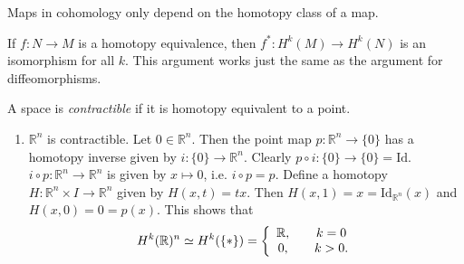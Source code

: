 \begin{enumerate}
{    \begin{theorem}
      Maps in cohomology only depend on the homotopy class of a map.
    \end{theorem}

    \begin{corol}
      If $f: N \to M$ is a homotopy equivalence, then
      $f^\ast : H^k(M) \to H^k(N)$ is an isomorphism for all $k$. This
      argument works just the same as the argument for diffeomorphisms.
    \end{corol}
  }
\end{enumerate}

\begin{defn}
  A space is \emph{contractible} if it is homotopy equivalent to a point.
\end{defn}

\begin{xmpl}
  \begin{enumerate}
    \item{
      $\mathbb{R}^n$ is contractible. Let $0 \in \mathbb{R}^n$. Then
      the point map $p : \mathbb{R}^n \to \{ 0 \}$ has a homotopy
      inverse given by $i: \{0\} \to \mathbb{R}^n$. Clearly
      $p \circ i : \{0\} \to \{0\} = \mathrm{Id}$.
      $i \circ p : \mathbb{R}^n \to \mathbb{R}^n$ is given by
      $x \mapsto 0$, i.e. $i \circ p = p$. Define a homotopy
      $H: \mathbb{R}^n \times I \to \mathbb{R}^n$ given by
      $H(x, t) = t x$. Then $H(x,1) = x =
      \mathrm{Id}_{\mathbb{R}^n}(x)$ and $H(x, 0) = 0 = p(x)$.
      This shows that
      $$
             H^k(\mathbb{R})^n
      \simeq H^k(\{\ast\})
      =      \left\{
               \begin{array}{c c}
                 \mathbb{R}, & \quad k = 0 \\
                 0,          & \quad k > 0.
               \end{array}
             \right.
     $$
     }
  \end{enumerate}
\end{xmpl}

